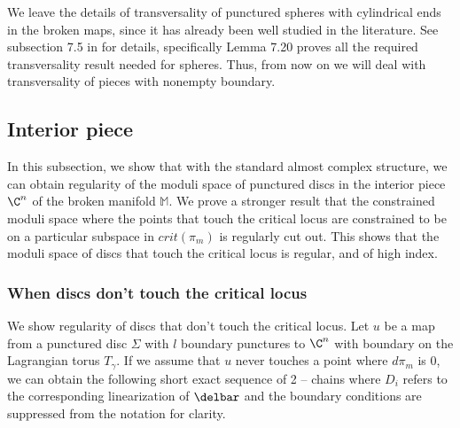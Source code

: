 \begin{remark}
    We leave the details of transversality of punctured spheres with cylindrical ends in the broken maps, since it has already been well studied in the literature. See subsection 7.5 in \cite{floerflip} for details, specifically Lemma 7.20 proves all the required transversality result needed for spheres. Thus, from now on we will deal with transversality of pieces with nonempty boundary.  
\end{remark}



\subsection{Interior piece} \label{ssec:interior}

In this subsection, we show that with the standard  almost complex structure, we can obtain regularity of the moduli space of punctured discs in the interior piece $\C^n$ of the broken manifold $\mathbb M$. We prove a stronger result that the constrained moduli space where the points that touch the critical locus are constrained to be on a particular subspace in $crit(\pi_m)$ is regularly cut out. This shows that the moduli space of discs that touch the critical locus is regular, and of high index.

\subsubsection{When discs don't touch the critical locus}
We show regularity of discs that don't touch the critical locus. Let $u$ be a map from a punctured disc $\Sigma$ with $l$ boundary punctures to $\C^n$ with boundary on the Lagrangian torus $T_\gamma$. If we assume that $u$ never touches a point where $d\pi_m$ is 0, we can obtain the following short exact sequence of 2 – chains where $D_i$ refers to the corresponding linearization of $\delbar$ and the boundary conditions are suppressed from the notation for clarity.



